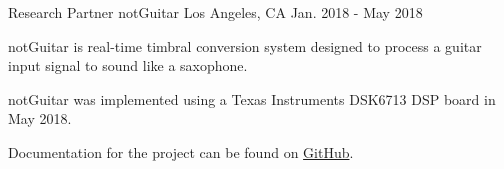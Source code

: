 \begin{cventries}
  \cventry
    {Research Partner} %
    {notGuitar} %
    {Los Angeles, CA} %
    {Jan. 2018 - May 2018} %
    {
      \begin{cvitems} %
        \item {notGuitar is real-time timbral conversion system designed to process a guitar input signal to sound like a saxophone.}
        \item {notGuitar was implemented using a Texas Instruments DSK6713 DSP board in May 2018.}
        \item {Documentation for the project can be found on \href{https://github.com/jatinchowdhury18/notGuitar}{GitHub}.}
      \end{cvitems}
    }

\end{cventries}
